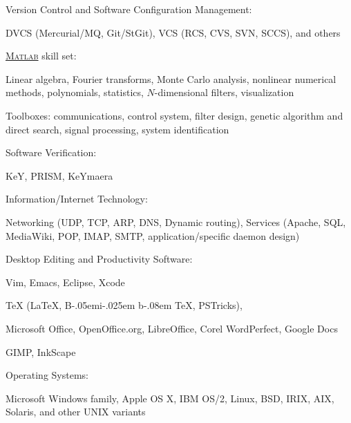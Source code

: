 \documentclass[10pt]{article}
\newcommand{\halfblankline}{\quad\vspace{-0.5\baselineskip}\pagebreak[3]}
\providecommand\BibTeX{{B\kern-.05em{\sc i\kern-.025em b}\kern-.08em \TeX}}
\providecommand\Matlab{\textsc{Matlab}}
\begin{document}
\halfblankline

Version Control and Software Configuration Management:
%
\begin{innerlist}
    \item DVCS (Mercurial/MQ, Git/StGit), VCS (RCS, CVS, SVN, SCCS), and
        others
\end{innerlist}

\halfblankline

\href{http://www.mathworks.com/products/matlab/}{\Matlab} skill set:
%
\begin{innerlist}
    \item Linear algebra, Fourier transforms, Monte Carlo analysis,
        nonlinear numerical methods, polynomials, statistics,
        $N$-dimensional filters, visualization

    \item Toolboxes: communications, control system, filter design,
        genetic algorithm and direct search, signal processing, system
        identification
\end{innerlist}

\halfblankline

Software Verification:
%
\begin{innerlist}
    \item KeY, PRISM, KeYmaera
\end{innerlist}

\halfblankline

Information/Internet Technology:
%
\begin{innerlist}
    \item Networking (UDP, TCP, ARP, DNS, Dynamic
        routing), Services (Apache, SQL, MediaWiki, POP, IMAP, SMTP,
        application\-/specific daemon design)
\end{innerlist}

\halfblankline

Desktop Editing and Productivity Software:
%
\begin{innerlist}
    \item Vim, Emacs, Eclipse, Xcode
    \item \TeX{} (\LaTeX{}, \BibTeX{}, PSTricks),
    \item Microsoft Office, OpenOffice.org, LibreOffice, Corel
        WordPerfect, Google Docs
    \item GIMP, InkScape
\end{innerlist}

\halfblankline

Operating Systems:
%
\begin{innerlist}
    \item Microsoft Windows family, Apple OS X, IBM OS/2, Linux, BSD,
        IRIX, AIX, Solaris, and other UNIX variants
\end{innerlist}
\end{document}
